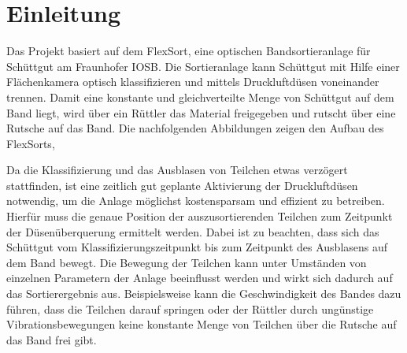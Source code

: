 \section{Einleitung}

Das Projekt basiert auf dem FlexSort, eine optischen Bandsortieranlage für Schüttgut am Fraunhofer IOSB. Die Sortieranlage kann Schüttgut mit Hilfe einer Flächenkamera optisch klassifizieren und mittels Druckluftdüsen voneinander trennen. Damit eine konstante und gleichverteilte Menge von Schüttgut auf dem Band liegt, wird über ein Rüttler das Material freigegeben und rutscht über eine Rutsche auf das Band. Die nachfolgenden Abbildungen zeigen den Aufbau des FlexSorts,

%


Da die Klassifizierung und das Ausblasen von Teilchen etwas verzögert stattfinden, ist eine zeitlich gut geplante Aktivierung der Druckluftdüsen notwendig, um die Anlage möglichst kostensparsam und effizient zu betreiben. Hierfür muss die genaue Position der auszusortierenden Teilchen zum Zeitpunkt der Düsenüberquerung ermittelt werden. Dabei ist zu beachten, dass sich das Schüttgut vom Klassifizierungszeitpunkt bis zum Zeitpunkt des Ausblasens auf dem Band bewegt. Die Bewegung der Teilchen kann unter Umständen von einzelnen Parametern der Anlage beeinflusst werden und wirkt sich dadurch auf das Sortierergebnis aus. Beispielsweise kann die Geschwindigkeit des Bandes dazu führen, dass die Teilchen darauf springen oder der Rüttler durch ungünstige Vibrationsbewegungen keine konstante Menge von Teilchen über die Rutsche auf das Band frei gibt. 

